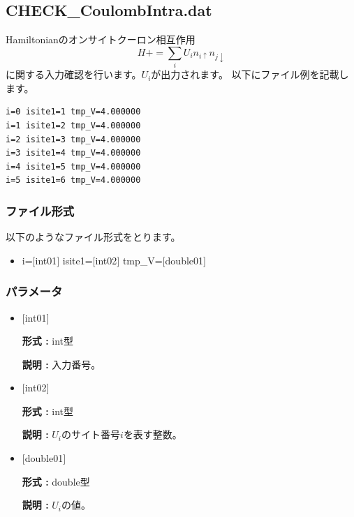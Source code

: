\newpage
\subsection{CHECK\_CoulombIntra.dat}
Hamiltonianのオンサイトクーロン相互作用
\begin{equation}
H+=\sum_{i} U_i n_{i\uparrow} n_{j \downarrow}
\end{equation}
に関する入力確認を行います。$U_i$が出力されます。
以下にファイル例を記載します。

\begin{minipage}{12.5cm}
\begin{screen}
\begin{verbatim}
i=0 isite1=1 tmp_V=4.000000 
i=1 isite1=2 tmp_V=4.000000 
i=2 isite1=3 tmp_V=4.000000 
i=3 isite1=4 tmp_V=4.000000 
i=4 isite1=5 tmp_V=4.000000 
i=5 isite1=6 tmp_V=4.000000 
\end{verbatim}
\end{screen}
\end{minipage}

\subsubsection{ファイル形式}
以下のようなファイル形式をとります。
 \begin{itemize}
   \item  i=$[$int01$]$ isite1=$[$int02$]$  tmp\_V=$[$double01$]$ 
 \end{itemize}
 
\subsubsection{パラメータ}
 \begin{itemize}

    \item  $[$int01$]$ 
   
    {\bf 形式 :} int型

   {\bf 説明 :} 入力番号。
      
   \item  $[$int02$]$
   
    {\bf 形式 :} int型

    {\bf 説明 :}   $U_i$のサイト番号$i$を表す整数。
    
   \item  $[$double01$]$ 
   
    {\bf 形式 :} double型

   {\bf 説明 :} $U_i$の値。  
\end{itemize}

